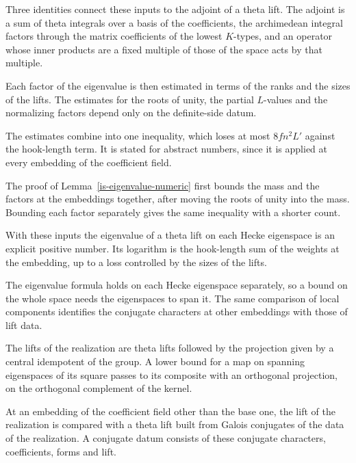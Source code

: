 Three identities connect these inputs to the adjoint of a theta lift. The adjoint is a sum of theta
integrals over a basis of the coefficients, the archimedean integral factors through the matrix
coefficients of the lowest $K$-types, and an operator whose inner products are a fixed multiple of
those of the space acts by that multiple.

Each factor of the eigenvalue is then estimated in terms of the ranks and the sizes of the lifts. The
estimates for the roots of unity, the partial $L$-values and the normalizing factors depend only on the
definite-side datum.

The estimates combine into one inequality, which loses at most $8fn^2L'$ against the hook-length term.
It is stated for abstract numbers, since it is applied at every embedding of the coefficient field.

The proof of Lemma~\ref{is-eigenvalue-numeric} first bounds the mass and the factors at the
embeddings together, after moving the roots of unity into the mass. Bounding each factor separately
gives the same inequality with a shorter count.

With these inputs the eigenvalue of a theta lift on each Hecke eigenspace is an explicit positive
number. Its logarithm is the hook-length sum of the weights at the embedding, up to a loss controlled
by the sizes of the lifts.

The eigenvalue formula holds on each Hecke eigenspace separately, so a bound on the whole space needs
the eigenspaces to span it. The same comparison of local components identifies the conjugate characters
at other embeddings with those of lift data.

The lifts of the realization are theta lifts followed by the projection given by a central idempotent
of the group. A lower bound for a map on spanning eigenspaces of its square passes to its composite
with an orthogonal projection, on the orthogonal complement of the kernel.

At an embedding of the coefficient field other than the base one, the lift of the realization is
compared with a theta lift built from Galois conjugates of the data of the realization. A conjugate
datum consists of these conjugate characters, coefficients, forms and lift.

